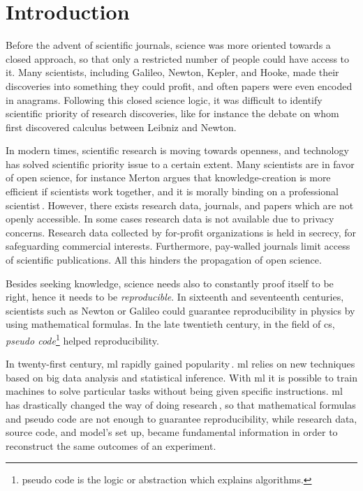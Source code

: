 \section{Introduction}
Before the advent of scientific journals,
science was more oriented towards a closed approach, so that only a restricted number
of people could have access to it.
Many scientists, including Galileo, Newton, Kepler, and Hooke, made their discoveries into
something they could profit, and often papers were even encoded in anagrams.
Following this closed science logic, it was difficult
to identify scientific priority of research discoveries, like for instance the
debate on whom first discovered calculus between Leibniz and Newton.

In modern times, scientific research is moving towards openness,
and technology has solved scientific priority issue to a certain extent.
Many scientists are in favor of open science, for instance
Merton argues that knowledge-creation is more efficient if scientists work together, and
it is morally binding on a professional scientist\,\cite{merton1942science}.
However, there exists research data, journals, and papers which are not openly accessible.
In some cases research data is not available due to privacy concerns.
Research data collected by for-profit organizations is held in secrecy, for
safeguarding commercial interests.
Furthermore, pay-walled journals limit access of scientific publications.
All this hinders the propagation of open science.

Besides seeking knowledge, science needs also to constantly proof itself
to be right, hence it needs to be \emph{reproducible}. 
In sixteenth and seventeenth centuries, scientists such as Newton or Galileo could guarantee
reproducibility in physics by using mathematical formulas.
%
In the late twentieth century, in the field of \ac{cs},
\emph{pseudo code}\footnote{pseudo code is the logic or abstraction which explains algorithms.}
helped reproducibility.

In twenty-first century, \ac{ml} rapidly gained popularity\,\cite{mjolsness2001machine}.
\ac{ml} relies on new techniques based on big data analysis and statistical inference.
With \ac{ml} it is possible to train machines to solve particular tasks without being
given specific instructions.
%
\ac{ml} has drastically changed the way of doing research\,\cite{anderson2008end},
so that mathematical formulas and pseudo code are not
enough to guarantee reproducibility, while research data, source code,
and model's set up, became fundamental information in order to reconstruct the
same outcomes of an experiment.

